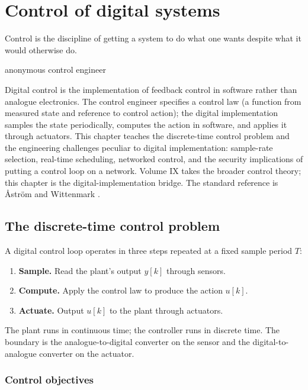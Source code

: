 \chapter{Control of digital systems}
\label{vol07:ch16}

\epigraph{Control is the discipline of getting a system to do what one wants despite what it would otherwise do.}{anonymous control engineer}


\noindent
Digital control is the implementation of feedback control in software rather than analogue electronics. The control engineer specifies a control law (a function from measured state and reference to control action); the digital implementation samples the state periodically, computes the action in software, and applies it through actuators. This chapter teaches the discrete-time control problem and the engineering challenges peculiar to digital implementation: sample-rate selection, real-time scheduling, networked control, and the security implications of putting a control loop on a network. Volume IX takes the broader control theory; this chapter is the digital-implementation bridge. The standard reference is \AA{}str{\"o}m and Wittenmark \cite{text:astrom-wittenmark}.

\section{The discrete-time control problem}

A digital control loop operates in three steps repeated at a fixed sample period $T$:

\begin{enumerate}[leftmargin=*]
  \item \textbf{Sample.} Read the plant's output $y[k]$ through sensors.
  \item \textbf{Compute.} Apply the control law to produce the action $u[k]$.
  \item \textbf{Actuate.} Output $u[k]$ to the plant through actuators.
\end{enumerate}

The plant runs in continuous time; the controller runs in discrete time. The boundary is the analogue-to-digital converter on the sensor and the digital-to-analogue converter on the actuator.

\subsection{Control objectives}

